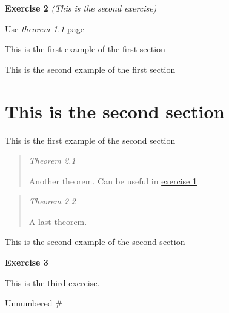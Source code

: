 \documentclass[]{article}
\providecommand{\tightlist}{%
  \setlength{\itemsep}{0pt}\setlength{\parskip}{0pt}}
\begin{document}
\protect\hypertarget{exercise:second}{}{\label{exercise:second}\textbf{Exercise
2} \emph{(This is the second exercise)}}

Use \protect\hyperlink{theorem:first}{\emph{theorem 1.1} page
\pageref{theorem:first}}

\begin{description}
\tightlist
\item[\phantomsection\addcontentsline{example}{example}{\protect\numberline {1.1}{\ignorespaces Example}}\protect\hypertarget{example:1.1}{}{\label{example:1.1}\textbf{Example
1}}]
This is the first example of the first section
\item[\phantomsection\addcontentsline{example}{example}{\protect\numberline {1.2}{\ignorespaces Example}}\protect\hypertarget{example:1.2}{}{\label{example:1.2}\textbf{Example
2}}]
This is the second example of the first section
\end{description}

\hypertarget{this-is-the-second-section}{%
\section{This is the second section}\label{this-is-the-second-section}}

\begin{description}
\tightlist
\item[\phantomsection\addcontentsline{example}{example}{\protect\numberline {2.1}{\ignorespaces Example}}\protect\hypertarget{example:2.1}{}{\label{example:2.1}\textbf{Example
1}}]
This is the first example of the second section
\end{description}

\begin{quote}
\protect\hypertarget{theorem:2.1}{}{\label{theorem:2.1}\emph{Theorem
2.1}}

Another theorem. Can be useful in
\protect\hyperlink{exercise:1}{exercise 1}
\end{quote}

\begin{quote}
\protect\hypertarget{theorem:2.2}{}{\label{theorem:2.2}\emph{Theorem
2.2}}

A last theorem.
\end{quote}

\begin{description}
\tightlist
\item[\phantomsection\addcontentsline{example}{example}{\protect\numberline {2.2}{\ignorespaces Example}}\protect\hypertarget{example:2.2}{}{\label{example:2.2}\textbf{Example
2}}]
This is the second example of the second section
\end{description}

\protect\hypertarget{exercise:last}{}{\label{exercise:last}\textbf{Exercise
3}}

This is the third exercise.

Unnumbered \#
\end{document}
